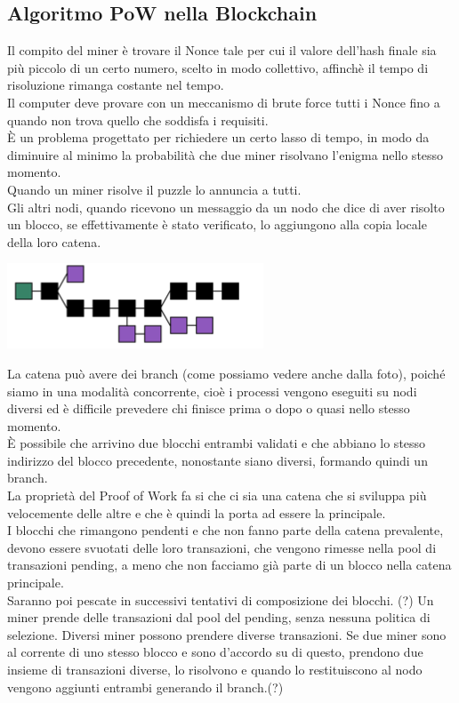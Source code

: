 \subsection{Algoritmo PoW nella Blockchain}
Il compito del miner è trovare il Nonce tale per cui il valore dell'hash finale sia più piccolo di un certo numero, scelto in modo collettivo, affinchè il tempo di risoluzione rimanga costante nel tempo.\\
Il computer deve provare con un meccanismo di brute force tutti i Nonce fino a quando non trova quello che soddisfa i requisiti.\\
È un problema progettato per richiedere un certo lasso di tempo, in modo da diminuire al minimo la probabilità che due miner risolvano l'enigma nello stesso momento.\\
Quando un miner risolve il puzzle lo annuncia a tutti.\\
Gli altri nodi, quando ricevono un messaggio da un nodo che dice di aver risolto un blocco, se effettivamente è stato verificato, lo aggiungono alla copia locale della loro catena. \\
\begin{center}
    \includegraphics[width = .6\textwidth]{images/lezione6/chain.png}
\end{center}
La catena può avere dei branch (come possiamo vedere anche dalla foto), poiché siamo in una modalità concorrente, cioè i processi vengono eseguiti su nodi diversi ed è difficile prevedere chi finisce prima o dopo o quasi nello stesso momento. \\
È possibile che arrivino due blocchi entrambi validati e che abbiano lo stesso indirizzo del blocco precedente, nonostante siano diversi, formando quindi un branch.\\
La proprietà del Proof of Work fa si che ci sia una catena che si sviluppa più velocemente delle altre e che è quindi la porta ad essere la principale. \\
I blocchi che rimangono pendenti e che non fanno parte della catena prevalente, devono essere svuotati delle loro transazioni, che vengono rimesse nella pool di transazioni pending, a meno che non facciamo già parte di un blocco nella catena principale. \\
Saranno poi pescate in successivi tentativi di composizione dei blocchi.
(?) Un miner prende delle transazioni dal pool del pending, senza nessuna politica di selezione. Diversi miner possono prendere diverse transazioni. Se due miner sono al corrente di uno stesso blocco e sono d'accordo su di questo, prendono due insieme di transazioni diverse, lo risolvono e quando lo restituiscono al nodo vengono aggiunti entrambi generando il branch.(?)

